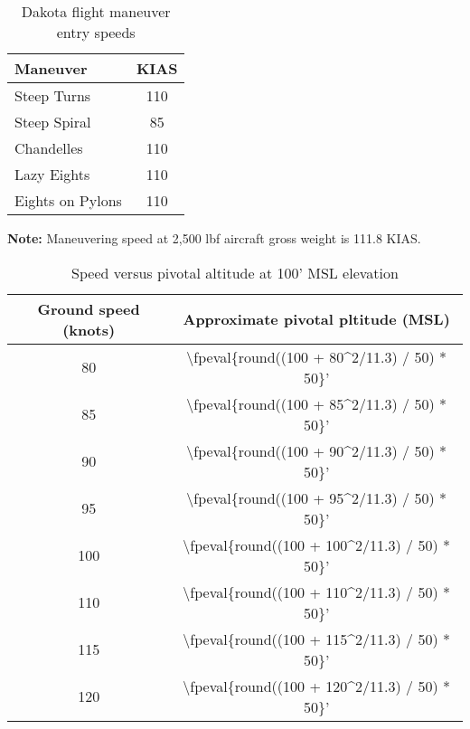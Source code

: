 \begin{table}[H]
    \caption{Dakota flight maneuver entry speeds}

    \begin{center}
        \begin{tabular}{lc}
            \toprule
            \textbf{Maneuver} & \textbf{KIAS} \\
            \midrule
            Steep Turns       & 110           \\
            Steep Spiral      & 85            \\
            Chandelles        & 110           \\
            Lazy Eights       & 110           \\
            Eights on Pylons  & 110           \\
            \bottomrule
        \end{tabular}
    \end{center}

    \textbf{Note:} Maneuvering speed at 2,500 lbf aircraft gross weight is 111.8 KIAS.
\end{table}

{}

\begin{table}[H]
    \caption{Speed versus pivotal altitude at 100' MSL elevation}

    \begin{center}
        \begin{tabular}{cc}
            \toprule
            \textbf{Ground speed (knots)} & \textbf{Approximate pivotal pltitude (MSL)}         \\
            \midrule
            80                            & \num{\fpeval{round((100 + 80^2/11.3) / 50) * 50}}'  \\
            85                            & \num{\fpeval{round((100 + 85^2/11.3) / 50) * 50}}'  \\
            90                            & \num{\fpeval{round((100 + 90^2/11.3) / 50) * 50}}'  \\
            95                            & \num{\fpeval{round((100 + 95^2/11.3) / 50) * 50}}'  \\
            100                           & \num{\fpeval{round((100 + 100^2/11.3) / 50) * 50}}' \\
            110                           & \num{\fpeval{round((100 + 110^2/11.3) / 50) * 50}}' \\
            115                           & \num{\fpeval{round((100 + 115^2/11.3) / 50) * 50}}' \\
            120                           & \num{\fpeval{round((100 + 120^2/11.3) / 50) * 50}}' \\
            \bottomrule
        \end{tabular}
    \end{center}
\end{table}
